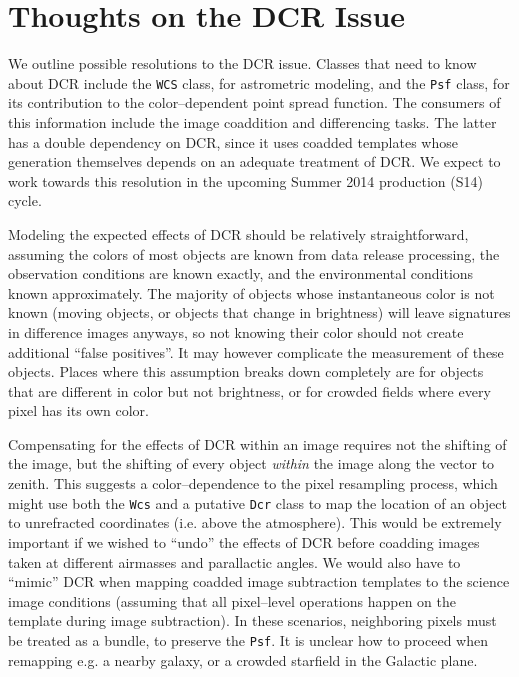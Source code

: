 \documentclass[prd, nofootinbib, floatfix, 11pt, tightenlines, times]{article}
\begin{document}
\section{Thoughts on the DCR Issue}

We outline possible resolutions to the DCR issue.  Classes that need
to know about DCR include the {\tt WCS} class, for astrometric
modeling, and the {\tt Psf} class, for its contribution to the
color--dependent point spread function.  The consumers of this
information include the image coaddition and differencing tasks.  The
latter has a double dependency on DCR, since it uses coadded templates
whose generation themselves depends on an adequate treatment of DCR.
We expect to work towards this resolution in the upcoming Summer 2014
production (S14) cycle.  

Modeling the expected effects of DCR should be relatively
straightforward, assuming the colors of most objects are known from
data release processing, the observation conditions are known exactly,
and the environmental conditions known approximately.  The majority of
objects whose instantaneous color is not known (moving objects, or
objects that change in brightness) will leave signatures in difference
images anyways, so not knowing their color should not create
additional ``false positives''.  It may however complicate the
measurement of these objects.  Places where this assumption breaks
down completely are for objects that are different in color but not
brightness, or for crowded fields where every pixel has its own color.

Compensating for the effects of DCR within an image requires not the
shifting of the image, but the shifting of every object {\it within}
the image along the vector to zenith.  This suggests a
color--dependence to the pixel resampling process, which might use both
the {\tt Wcs} and a putative {\tt Dcr} class to map the location of an
object to unrefracted coordinates (i.e. above the atmosphere).  This
would be extremely important if we wished to ``undo'' the effects of
DCR before coadding images taken at different airmasses and
parallactic angles.  We would also have to ``mimic'' DCR when mapping
coadded image subtraction templates to the science image conditions
(assuming that all pixel--level operations happen on the template
during image subtraction).  In these scenarios, neighboring pixels
must be treated as a bundle, to preserve the {\tt Psf}.  It is unclear
how to proceed when remapping e.g. a nearby galaxy, or a crowded
starfield in the Galactic plane.
\end{document}
